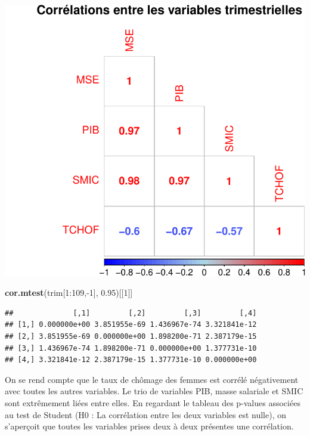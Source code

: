 \documentclass[11pt,]{article}
\newenvironment{Shaded}{\begin{snugshade}}{\end{snugshade}}
\newcommand{\KeywordTok}[1]{\textcolor[rgb]{0.13,0.29,0.53}{\textbf{{#1}}}}
\newcommand{\DecValTok}[1]{\textcolor[rgb]{0.00,0.00,0.81}{{#1}}}
\newcommand{\FloatTok}[1]{\textcolor[rgb]{0.00,0.00,0.81}{{#1}}}
\newcommand{\NormalTok}[1]{{#1}}
\begin{document}
\includegraphics{doc_files/figure-latex/unnamed-chunk-6-1.pdf}

\begin{Shaded}
\begin{Highlighting}[]
\KeywordTok{cor.mtest}\NormalTok{(trim[}\DecValTok{1}\NormalTok{:}\DecValTok{109}\NormalTok{,-}\DecValTok{1}\NormalTok{], }\FloatTok{0.95}\NormalTok{)[[}\DecValTok{1}\NormalTok{]]}
\end{Highlighting}
\end{Shaded}

\begin{verbatim}
##              [,1]         [,2]         [,3]         [,4]
## [1,] 0.000000e+00 3.851955e-69 1.436967e-74 3.321841e-12
## [2,] 3.851955e-69 0.000000e+00 1.898200e-71 2.387179e-15
## [3,] 1.436967e-74 1.898200e-71 0.000000e+00 1.377731e-10
## [4,] 3.321841e-12 2.387179e-15 1.377731e-10 0.000000e+00
\end{verbatim}

On se rend compte que le taux de chômage des femmes est corrélé
négativement avec toutes les autres variables. Le trio de variables PIB,
masse salariale et SMIC sont extrêmement liées entre elles. En regardant
le tableau des p-values associées au test de Student (H0 : La
corrélation entre les deux variables est nulle), on s'aperçoit que
toutes les variables prises deux à deux présentes une corrélation.
\end{document}
